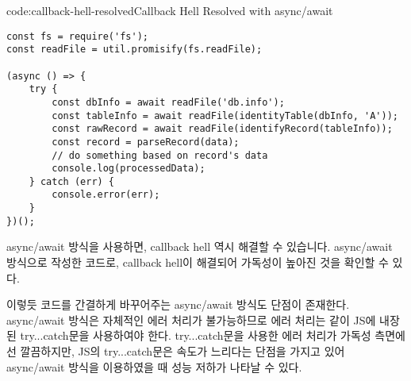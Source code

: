 \begin{codeenv}{code:callback-hell-resolved}{Callback Hell Resolved with async/await}\begin{verbatim}
const fs = require('fs');
const readFile = util.promisify(fs.readFile);

(async () => {
    try {
        const dbInfo = await readFile('db.info');
        const tableInfo = await readFile(identityTable(dbInfo, 'A'));
        const rawRecord = await readFile(identifyRecord(tableInfo));
        const record = parseRecord(data);
        // do something based on record's data
        console.log(processedData);
    } catch (err) {
        console.error(err);
    }
})();
\end{verbatim}
\end{codeenv}

async/await 방식을 사용하면, callback hell 역시 해결할 수 있습니다. \는 \을 async/await 방식으로 작성한 코드로, callback hell이 해결되어 가독성이 높아진 것을 확인할 수 있다. 

이렇듯 코드를 간결하게 바꾸어주는 async/await 방식도 단점이 존재한다. async/await 방식은 자체적인 에러 처리가 불가능하므로 에러 처리는 \과 같이 JS에 내장된 try...catch문을 사용하여야 한다. try...catch문을 사용한 에러 처리가 가독성 측면에선 깔끔하지만, JS의 try...catch문은 속도가 느리다는 단점을 가지고 있어 async/await 방식을 이용하였을 때 성능 저하가 나타날 수 있다.
